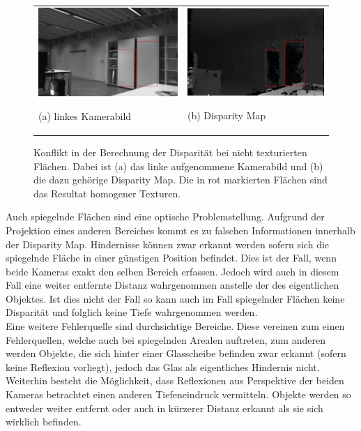 \begin{figure}[h]
	\centering
	\begin{tabular}{m{6.5cm} m{6.5cm}}
	\includegraphics[width=6.5cm]{img/disparity_error_left.pdf}
	\begin{center} \small (a) linkes Kamerabild \end{center}
	&
	\includegraphics[width=6.5cm]{img/disparity_error.pdf}
	\begin{center} \small (b) Disparity Map \end{center}
	\end{tabular}
    \caption{Konflikt in der Berechnung der Disparität bei nicht texturierten Flächen. Dabei ist (a) das linke aufgenommene Kamerabild und (b) die dazu gehörige Disparity Map. Die in rot markierten Flächen sind das Resultat homogener Texturen.}
    \label{fig:disparity-error-homogeneous}
\end{figure}

\noindent
Auch spiegelnde Flächen sind eine optische Problemstellung. Aufgrund der Projektion eines anderen Bereiches kommt es zu falschen Informationen innerhalb der Disparity Map. Hindernisse können zwar erkannt werden sofern sich die spiegelnde Fläche in einer günstigen Position befindet. Dies ist der Fall, wenn beide Kameras exakt den selben Bereich erfassen. Jedoch wird auch in diesem Fall eine weiter entfernte Distanz wahrgenommen anstelle der des eigentlichen Objektes. 
Ist dies nicht der Fall so kann auch im Fall spiegelnder Flächen keine Disparität und folglich keine Tiefe wahrgenommen werden.\\
    
\noindent
Eine weitere Fehlerquelle sind durchsichtige Bereiche. Diese vereinen zum einen Fehlerquellen, welche auch bei spiegelnden Arealen auftreten, zum anderen werden Objekte, die sich hinter einer Glasscheibe befinden zwar erkannt (sofern keine Reflexion vorliegt), jedoch das Glas als eigentliches Hindernis nicht. Weiterhin besteht die Möglichkeit, dass Reflexionen aus Perspektive der beiden Kameras betrachtet einen anderen Tiefeneindruck vermitteln. Objekte werden so entweder weiter entfernt oder auch in kürzerer Distanz erkannt als sie sich wirklich befinden.\\

